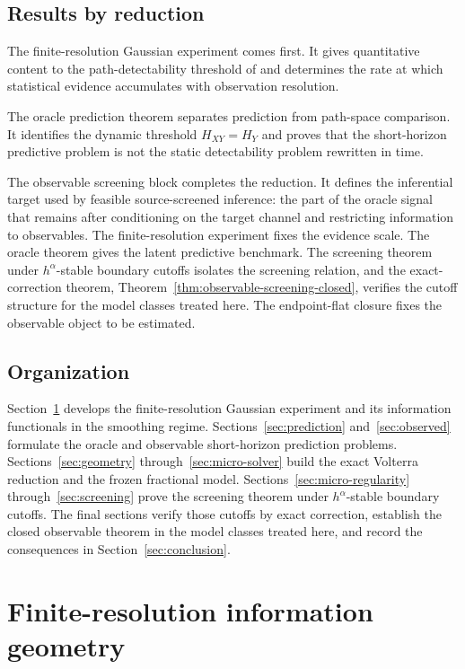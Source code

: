 \documentclass[11pt,a4paper]{amsart}
\theoremstyle{plain}
\theoremstyle{definition}
\theoremstyle{remark}
\begin{document}
\subsection*{Results by reduction}
The finite-resolution Gaussian experiment comes first.  It gives quantitative content to the
path-detectability threshold of \cite{vidal2026latent} and determines the rate at which statistical
evidence accumulates with observation resolution.

The oracle prediction theorem separates prediction from path-space comparison.  It identifies the
dynamic threshold \(H_{XY}=H_Y\) and proves that the short-horizon predictive problem is not the
static detectability problem rewritten in time.

The observable screening block completes the reduction.  It defines the inferential target used by
feasible source-screened inference: the part of the oracle signal that remains after conditioning on
the target channel and restricting information to observables.  The finite-resolution experiment
fixes the evidence scale.  The oracle theorem gives the latent predictive benchmark.  The screening
theorem under \(h^\alpha\)-stable boundary cutoffs isolates the screening relation, and the
exact-correction theorem, Theorem~\ref{thm:observable-screening-closed}, verifies the cutoff
structure for the model classes treated here.  The endpoint-flat closure fixes the observable object
to be estimated.

\subsection*{Organization}
Section~\ref{sec:finres} develops the finite-resolution Gaussian experiment and its information
functionals in the smoothing regime.  Sections~\ref{sec:prediction} and~\ref{sec:observed}
formulate the oracle and observable short-horizon prediction problems.  Sections~\ref{sec:geometry}
through~\ref{sec:micro-solver} build the exact Volterra reduction and the frozen fractional model.
Sections~\ref{sec:micro-regularity} through~\ref{sec:screening} prove the screening theorem under
\(h^\alpha\)-stable boundary cutoffs.  The final sections verify those cutoffs by exact correction,
establish the closed observable theorem in the model classes treated here, and record the
consequences in Section~\ref{sec:conclusion}.

\section{Finite-resolution information geometry}\label{sec:finres}
\end{document}
